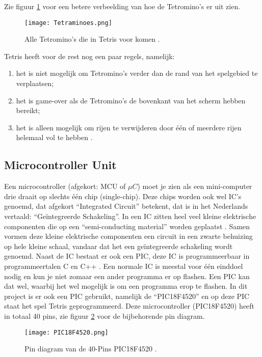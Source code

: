 Zie figuur \ref{fig:Tetrominos} voor een betere verbeelding van hoe de Tetromino's er uit zien.
\begin{figure}[htbp]
    \centering
    \texttt{[image: Tetraminoes.png]}
    \caption{Alle Tetromino's die in Tetris voor komen \cite{Burgiel1997}.}
    \label{fig:Tetrominos}
\end{figure}

Tetris heeft voor de rest nog een paar regels, namelijk:
\begin{enumerate}
    \item het is niet mogelijk om Tetromino's verder dan de rand van het spelgebied te verplaatsen;
    \item het is game-over als de Tetromino's de bovenkant van het scherm hebben bereikt;
    \item het is alleen mogelijk om rijen te verwijderen door één of meerdere rijen helemaal vol te hebben \cite{BREUKELAAR2004}. 
\end{enumerate}

\subsection{Microcontroller Unit}
Een microcontroller (afgekort: MCU of \(\mu C\)) moet je zien als een mini-computer drie draait op slechts één chip (single-chip). 
Deze chips worden ook wel IC's genoemd, dat afgekort ``Integrated Circuit'' betekent, dat is in het Nederlands vertaald: ``Geïntegreerde Schakeling''. 
In een IC zitten heel veel kleine elektrische componenten die op een ``semi-conducting material'' worden geplaatst \cite{ibrahim2006microcontroller}. 
Samen vormen deze kleine elektrische componenten een circuit in een zwarte behuizing op hele kleine schaal, vandaar dat het een geïntegreerde schakeling wordt genoemd. 
Naast de IC bestaat er ook een PIC, deze IC is programmeerbaar in programmeertalen C en C++ \cite{morton2005pic}.
Een normale IC is meestal voor één einddoel nodig en kun je niet zomaar een ander programma er op flashen. 
Een PIC kan dat wel, waarbij het wel mogelijk is om een programma erop te flashen. 
In dit project is er ook een PIC gebruikt, namelijk de ``PIC18F4520'' en op deze PIC staat het spel Tetris geprogrammeerd. 
Deze microcontroller (PIC18F4520) heeft in totaal 40 pins, zie figuur \ref{fig:PIC18F4520} voor de bijbehorende pin diagram.
\begin{figure}[htbp]
    \centering
    \texttt{[image: PIC18F4520.png]}
    \caption{Pin diagram van de 40-Pins PIC18F4520 \cite{PIC18F4520}.}
    \label{fig:PIC18F4520}
\end{figure}


